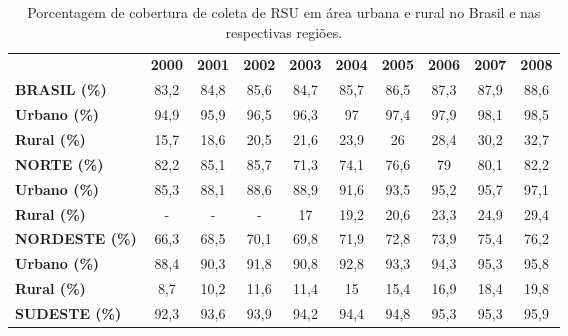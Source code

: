 \begin{center}
\begin{table}[htbp]
	\centering
	\caption{Porcentagem de cobertura de coleta de RSU em área urbana e rural no Brasil e nas respectivas regiões.}


	\begin{tabular}{p{8.355em}c|c|c|c|c|c|c|c|c}
		\rowcolor[rgb]{ .969,  .588,  .275} \multicolumn{1}{c}{\textcolor[rgb]{ 1,  1,  1}{}} & \textcolor[rgb]{ 1,  1,  1}{\textbf{2000}} & \textcolor[rgb]{ 1,  1,  1}{\textbf{2001}} & \textcolor[rgb]{ 1,  1,  1}{\textbf{2002}} & \textcolor[rgb]{ 1,  1,  1}{\textbf{2003}} & \textcolor[rgb]{ 1,  1,  1}{\textbf{2004}} & \textcolor[rgb]{ 1,  1,  1}{\textbf{2005}} & \textcolor[rgb]{ 1,  1,  1}{\textbf{2006}} & \textcolor[rgb]{ 1,  1,  1}{\textbf{2007}} & \textcolor[rgb]{ 1,  1,  1}{\textbf{2008}} \\
		\rowcolor[rgb]{ .984,  .831,  .706} \textbf{BRASIL (\%)} & 83,2  & 84,8  & 85,6  & 84,7  & 85,7  & 86,5  & 87,3  & 87,9  & 88,6 \\
		\textbf{Urbano (\%)} & 94,9  & 95,9  & 96,5  & 96,3  & 97    & 97,4  & 97,9  & 98,1  & 98,5 \\
		\rowcolor[rgb]{ .992,  .914,  .851} \textbf{Rural (\%)} & 15,7  & 18,6  & 20,5  & 21,6  & 23,9  & 26    & 28,4  & 30,2  & 32,7 \\
		\rowcolor[rgb]{ .984,  .831,  .706} \textbf{NORTE (\%)} & 82,2  & 85,1  & 85,7  & 71,3  & 74,1  & 76,6  & 79    & 80,1  & 82,2 \\
		\rowcolor[rgb]{ .992,  .914,  .851} \textbf{Urbano (\%)} & 85,3  & 88,1  & 88,6  & 88,9  & 91,6  & 93,5  & 95,2  & 95,7  & 97,1 \\
		\textbf{Rural (\%)} & \multicolumn{1}{p{3.785em}}{-} & \multicolumn{1}{p{3.785em}}{-} & \multicolumn{1}{p{3.785em}}{-} & 17    & 19,2  & 20,6  & 23,3  & 24,9  & 29,4 \\
		\rowcolor[rgb]{ .984,  .831,  .706} \textbf{NORDESTE (\%)} & 66,3  & 68,5  & 70,1  & 69,8  & 71,9  & 72,8  & 73,9  & 75,4  & 76,2 \\
		\textbf{Urbano (\%)} & 88,4  & 90,3  & 91,8  & 90,8  & 92,8  & 93,3  & 94,3  & 95,3  & 95,8 \\
		\rowcolor[rgb]{ .992,  .914,  .851} \textbf{Rural (\%)} & 8,7   & 10,2  & 11,6  & 11,4  & 15    & 15,4  & 16,9  & 18,4  & 19,8 \\
		\rowcolor[rgb]{ .984,  .831,  .706} \textbf{SUDESTE (\%)} & 92,3  & 93,6  & 93,9  & 94,2  & 94,4  & 94,8  & 95,3  & 95,3  & 95,9 \\

\end{tabular}
\end{table}
\end{center}
